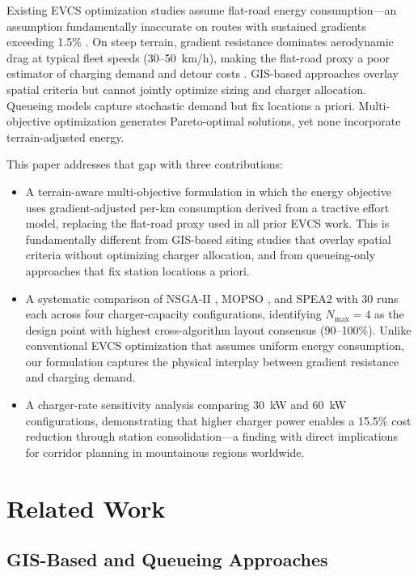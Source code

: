 \documentclass[conference]{IEEEtran}
\begin{document}
Existing EVCS optimization studies \cite{13,14,15,16,17} assume flat-road energy consumption---an assumption fundamentally inaccurate on routes with sustained gradients exceeding 1.5\% \cite{10,11,12}. On steep terrain, gradient resistance dominates aerodynamic drag at typical fleet speeds (30--50~km/h), making the flat-road proxy a poor estimator of charging demand and detour costs \cite{12,18}. GIS-based approaches \cite{13} overlay spatial criteria but cannot jointly optimize sizing and charger allocation. Queueing models \cite{19} capture stochastic demand but fix locations a priori. Multi-objective optimization \cite{14,15,16} generates Pareto-optimal solutions, yet none incorporate terrain-adjusted energy.

This paper addresses that gap with three contributions:
\begin{itemize}
\item A terrain-aware multi-objective formulation in which the energy objective uses gradient-adjusted per-km consumption derived from a tractive effort model, replacing the flat-road proxy used in all prior EVCS work. This is fundamentally different from GIS-based siting studies \cite{13,23,24} that overlay spatial criteria without optimizing charger allocation, and from queueing-only approaches \cite{19} that fix station locations a priori.
\item A systematic comparison of NSGA-II \cite{20}, MOPSO \cite{21}, and SPEA2 \cite{22} with 30 runs each across four charger-capacity configurations, identifying $N_{\max} = 4$ as the design point with highest cross-algorithm layout consensus (90--100\%). Unlike conventional EVCS optimization \cite{14,15,16} that assumes uniform energy consumption, our formulation captures the physical interplay between gradient resistance and charging demand.
\item A charger-rate sensitivity analysis comparing 30~kW and 60~kW configurations, demonstrating that higher charger power enables a 15.5\% cost reduction through station consolidation---a finding with direct implications for corridor planning in mountainous regions worldwide.
\end{itemize}

\section{Related Work}
\label{sec:related}

\subsection{GIS-Based and Queueing Approaches}
\end{document}
